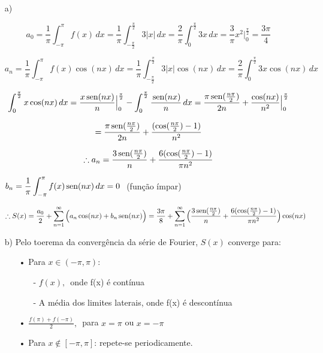 \documentclass[12pt,a4paper]{article}
\newcommand{\sen}{\mbox{\,sen}}
\begin{document}
\begin{itemize}
\item[a)]

$$ a_0 = \frac{1}{\pi} \int_{-\pi}^\pi f(x) \, dx = \frac{1}{\pi} \int_{-\frac{\pi}{2}}^{\frac{\pi}{2}} 3 |x| \, dx = \frac{2}{\pi} \int_{0}^{\frac{\pi}{2}} 3 x \, dx = \frac{3}{\pi} x^2 \Big|_0^{\frac{\pi}{2}} = \frac{3\pi}{4} $$

$$ a_n = \frac{1}{\pi} \int_{-\pi}^\pi f(x) \cos (n x) \, dx = \frac{1}{\pi} \int_{-\frac{\pi}{2}}^{\frac{\pi}{2}} 3 |x| \cos (n x) \, dx = \frac{2}{\pi} \int_{0}^{\frac{\pi}{2}} 3 x \cos (n x) \, dx $$

$$ \int_{0}^{\frac{\pi}{2}}  x \cos (n x) \, dx =  \frac{x \sen (nx)}{n} \Big|_0^\frac{\pi}{2} -  \int_{0}^{\frac{\pi}{2}} \frac{\sen(nx)}{n} \,dx = \frac{\pi \sen( \frac{n \pi}{2})}{2 n} + \frac{\cos (nx)}{n^2} \Big|_0^\frac{\pi}{2}    $$

$$ = \frac{\pi \sen( \frac{n \pi}{2})}{2 n} + \frac{ ( \cos (\frac{n \pi}{2}) -1)}{n^2} $$

$$ \therefore a_n =  \frac{ 3 \sen( \frac{n \pi}{2})}{ n} +  \frac{ 6 ( \cos (\frac{n \pi}{2}) -1)}{\pi n^2} $$

\begin{center}
$b_n = \displaystyle\frac{1}{\pi} \displaystyle\int_{-\pi}^\pi f(x) \sen (n x) \, dx = 0 \,\,$ (função ímpar)
\end{center}

$$ \therefore S(x) = \frac{a_0}{2} + \sum_{n=1}^\infty \Big( a_n \cos(nx) + b_n \sen(nx) \Big) = \frac{3\pi}{8} + \sum_{n=1}^\infty \Big( \frac{ 3 \sen( \frac{n \pi}{2})}{ n} +  \frac{ 6 ( \cos (\frac{n \pi}{2}) -1)}{\pi n^2} \Big) \cos (nx) $$

\item[b)] Pelo toerema da convergência da série de Fourier, $S(x)$ converge para:

\begin{itemize}
\item[•] Para $x \in  (-\pi,\pi)$:
	\begin{itemize}
	\item[-] $f(x), \,$ onde f(x) é contínua
	\item[-] A média dos limites laterais, onde f(x) é descontínua
	\end{itemize}
\item[•] $\displaystyle\frac{f(\pi)+f(-\pi)}{2}, \, $ para $ x = \pi $ ou $ x = -\pi $ 
\item[•] Para $x \notin [ -\pi,\pi]$: repete-se periodicamente.
\end{itemize}


\end{itemize}
\end{document}
